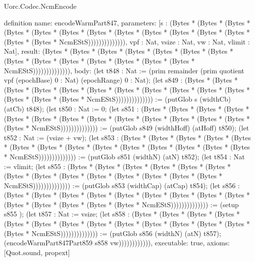 \begin{lexlean}{Uorc.Codec.NcmEncode}
\begin{semanticmodule}
definition{
  name: encodeWarmPart847,
  parameters: [s : (Bytes * (Bytes * (Bytes * (Bytes * (Bytes * (Bytes * (Bytes * (Bytes * (Bytes * (Bytes * (Bytes * (Bytes * (Bytes * (Bytes * NcmEStS)))))))))))))), vpf : Nat, vsize : Nat, vw : Nat, vlimit : Nat],
  result: (Bytes * (Bytes * (Bytes * (Bytes * (Bytes * (Bytes * (Bytes * (Bytes * (Bytes * (Bytes * (Bytes * (Bytes * (Bytes * (Bytes * NcmEStS)))))))))))))),
  body: (let t848 : Nat := (prim remainder (prim quotient vpf (epochBase) 0 : Nat) (epochRange) 0 : Nat); (let s849 : (Bytes * (Bytes * (Bytes * (Bytes * (Bytes * (Bytes * (Bytes * (Bytes * (Bytes * (Bytes * (Bytes * (Bytes * (Bytes * (Bytes * NcmEStS)))))))))))))) := (putGlob s (widthCb) (atCb) t848); (let t850 : Nat := 0; (let s851 : (Bytes * (Bytes * (Bytes * (Bytes * (Bytes * (Bytes * (Bytes * (Bytes * (Bytes * (Bytes * (Bytes * (Bytes * (Bytes * (Bytes * NcmEStS)))))))))))))) := (putGlob s849 (widthHoff) (atHoff) t850); (let t852 : Nat := (vsize + vw); (let s853 : (Bytes * (Bytes * (Bytes * (Bytes * (Bytes * (Bytes * (Bytes * (Bytes * (Bytes * (Bytes * (Bytes * (Bytes * (Bytes * (Bytes * NcmEStS)))))))))))))) := (putGlob s851 (widthN) (atN) t852); (let t854 : Nat := vlimit; (let s855 : (Bytes * (Bytes * (Bytes * (Bytes * (Bytes * (Bytes * (Bytes * (Bytes * (Bytes * (Bytes * (Bytes * (Bytes * (Bytes * (Bytes * NcmEStS)))))))))))))) := (putGlob s853 (widthCap) (atCap) t854); (let s856 : (Bytes * (Bytes * (Bytes * (Bytes * (Bytes * (Bytes * (Bytes * (Bytes * (Bytes * (Bytes * (Bytes * (Bytes * (Bytes * (Bytes * NcmEStS)))))))))))))) := (setup s855 ); (let t857 : Nat := vsize; (let s858 : (Bytes * (Bytes * (Bytes * (Bytes * (Bytes * (Bytes * (Bytes * (Bytes * (Bytes * (Bytes * (Bytes * (Bytes * (Bytes * (Bytes * NcmEStS)))))))))))))) := (putGlob s856 (widthN) (atN) t857); (encodeWarmPart847Part859 s858 vw)))))))))))),
  executable: true,
  axioms: [Quot.sound, propext]
}


\end{semanticmodule}
\end{lexlean}
